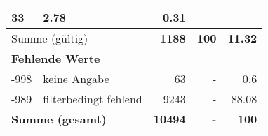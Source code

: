\begin{longtable}{lXrrr}
       \num{33} &
       \num[round-mode=places,round-precision=2]{2,78} &
         \num[round-mode=places,round-precision=2]{0,31} \\
     \midrule
     \multicolumn{2}{l}{Summe (gültig)} &
       \textbf{\num{1188}} &
     \textbf{100} &
       \textbf{\num[round-mode=places,round-precision=2]{11,32}} \\
     \multicolumn{5}{l}{\textbf{Fehlende Werte}}\\
       -998 &
       keine Angabe &
         \num{63} &
        - &
         \num[round-mode=places,round-precision=2]{0,6} \\
       -989 &
       filterbedingt fehlend &
         \num{9243} &
        - &
         \num[round-mode=places,round-precision=2]{88,08} \\
     \midrule
     \multicolumn{2}{l}{\textbf{Summe (gesamt)}} &
          \textbf{\num{10494}} &
        \textbf{-} &
        \textbf{100} \\
     \bottomrule
     \end{longtable}
     
